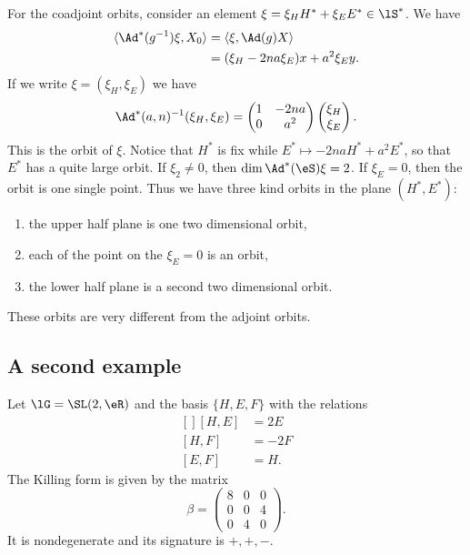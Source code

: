 For the coadjoint orbits, consider an element $\xi=\xi_HH^*+\xi_EE^*\in\lS^*$. We have
\begin{equation}
	\begin{aligned}[]
		\langle \Ad^*(g^{-1})\xi, X_0\rangle & =\langle \xi, \Ad(g)X\rangle  \\
		                                     & =(\xi_H-2na\xi_E)x+a^2\xi_Ey.
	\end{aligned}
\end{equation}
If we write $\xi=(\xi_H,\xi_E)$ we have
\begin{equation}
	\Ad^*(a,n)^{-1}(\xi_H,\xi_E)=\begin{pmatrix}
		1 & -2na \\
		0 & a^2
	\end{pmatrix}\begin{pmatrix}
		\xi_H \\
		\xi_E
	\end{pmatrix}.
\end{equation}
This is the orbit of $\xi$. Notice that $H^*$ is fix while $E^*\mapsto -2na H^*+a^2E^*$, so that $E^*$ has a quite large orbit. If $\xi_2\neq 0$, then $\dim\Ad^*(\eS)\xi=2$. If $\xi_E=0$, then the orbit is one single point. Thus we have three kind orbits in the plane $(H^*,E^*)$:
\begin{enumerate}

	\item
	      the upper half plane is one two dimensional orbit,
	\item
	      each of the point on the $\xi_E=0$ is an orbit,
	\item
	      the lower half plane is a second two dimensional orbit.
\end{enumerate}
These orbits are very different from the adjoint orbits.

\subsection{A second example}

Let $\lG=\SL(2,\eR)$ and the basis $\{ H,E,F \}$ with the relations
\begin{equation}
	\begin{aligned}[]
		[H,E] & =2E  \\
		[H,F] & =-2F \\
		[E,F] & =H.
	\end{aligned}
\end{equation}
The Killing form is given by the matrix
\begin{equation}
	\beta=\begin{pmatrix}
		8 & 0 & 0 \\
		0 & 0 & 4 \\
		0 & 4 & 0
	\end{pmatrix}.
\end{equation}
It is nondegenerate and its signature is $+,+,-$.


